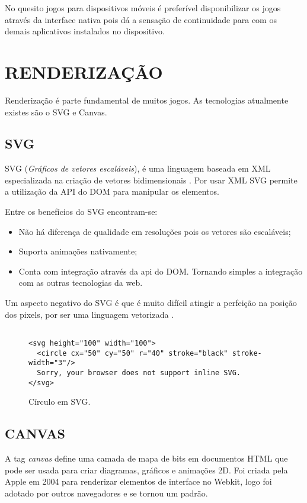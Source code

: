 No quesito jogos para dispositivos móveis é preferível disponibilizar
os jogos através da interface nativa pois dá a sensação de
continuidade para com os demais aplicativos instalados no dispositivo.

\section{RENDERIZAÇÃO}

Renderização é parte fundamental de muitos jogos. As tecnologias atualmente existes são o SVG e Canvas.

\subsection{SVG}
SVG (\textit{Gráficos de vetores escaláveis}), é uma linguagem
baseada em XML especializada na criação de vetores bidimensionais
\autocite{html5mostwanted}. Por usar XML SVG permite a utilização da
API do DOM para manipular os elementos.

Entre os benefícios do SVG encontram-se:

\begin{itemize}
\item Não há diferença de qualidade em resoluções pois os vetores são escaláveis;
\item Suporta animações nativamente;
\item Conta com integração através da api do DOM. Tornando simples a integração com as outras tecnologias da web.
\end{itemize}

Um aspecto negativo do SVG é que é muito difícil atingir a
perfeição na posição dos pixels, por ser uma linguagem vetorizada
\autocite{html5mostwanted}.

\begin{figure}
\centering
\begin{verbatim}

<svg height="100" width="100">
  <circle cx="50" cy="50" r="40" stroke="black" stroke-width="3"/>
  Sorry, your browser does not support inline SVG.
</svg>

\end{verbatim}
\caption{Círculo em SVG.}
\end{figure}
\subsection{CANVAS}

A tag \textit{canvas} define uma camada de mapa de bits em documentos
HTML que pode ser usada para criar diagramas, gráficos e animações
2D. Foi criada pela Apple em 2004 para renderizar elementos de interface
no Webkit, logo foi adotado por outros navegadores e se tornou um
padrão.

